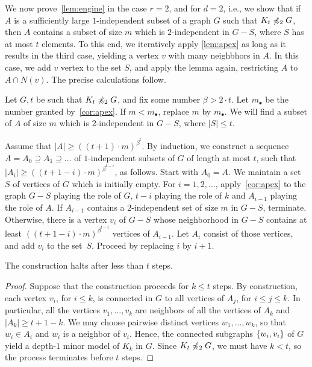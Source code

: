 We now prove~\cref{lem:engine} in the case $r=2$, and for $d=2$, i.e., we show  that if $A$ is a sufficiently large $1$-independent subset of a graph $G$ such that $K_t\not\preccurlyeq_2 G$, then $A$ contains a subset of size $m$
which is  $2$-independent in  $G-S$, where $S$ has at most $t$ elements. 
To this end, we iteratively apply \cref{lem:apex} as long as  it results in the third case, yielding a vertex $v$ with many neighbhors in $A$. In this case, we add $v$ vertex to the set $S$, and apply the lemma again,
restricting $A$ to $A\cap N(v)$. 
The precise calculations follow.

Let $G,t$ be such that $K_t\not\preccurlyeq_2 G$, and fix some number $\beta>2\cdot t$. Let $m_\bullet$ be the number granted by~\cref{cor:apex}. If $m<m_\bullet$, replace $m$ by $m_\bullet$. We will find 
a subset of $A$ of size $m$ which is $2$-independent in $G-S$, where $|S|\le t$.


Assume that $|A|\ge ((t+1)\cdot m)^{\beta^{t}}$. By induction, we
 construct a sequence  $A=A_0\supseteq A_1\supseteq\ldots$ 
of $1$-independent subsets of $G$
of length at most $t$,
such that $|A_i|\ge ((t+1-i)\cdot m)^{\beta^{t-i}}$,
 as follows. Start with $A_0=A$. We maintain a set $S$ of vertices of $G$ which is initially empty.
For $i=1,2,\ldots$,
 apply~\cref{cor:apex} to the graph $G-S$ playing the role of $G$, 
$t-i$ playing the role of $k$ and $A_{i-1}$
 playing the role of $A$.
If $A_{i-1}$ contains a $2$-independent set of size $m$ in $G-S$, terminate.
 Otherwise, there is a vertex $v_i$ of $G-S$
 whose neighborhood in $G-S$ contains at least
 $((t+1-i)\cdot m)^{\beta^{t-i}}$ vertices of $A_{i-1}$.
 Let $A_{i}$ consist of those vertices, and add $v_i$
 to the set~$S$.  
  Proceed by replacing $i$ by $i+1$.

\begin{claim}\label{claim:at-most-t}
	The construction halts after less than $t$ steps.
\end{claim}
\begin{proof}
Suppose that the construction proceeds for $k\le t$ steps.
By construction, each vertex $v_i$, for $i\le k$, is connected in $G$
 to all vertices of $A_{j}$, for $i\le j\le k$. In particular, all the vertices $v_1,\ldots,v_k$ are neighbors of all the vertices of $A_{k}$
 and $|A_k|\ge t+1-k$.
We may choose pairwise distinct vertices $w_1,\ldots,w_k$,
 so that $w_i\in A_i$ and $w_i$ is a neighbor of $v_i$.
 Hence, the connected subgraphs $\{w_i,v_i\}$ of $G$ yield a depth-$1$ minor model of $K_k$ in $G$.
 Since $K_t\not\preccurlyeq_2 G$, we must have $k<t$, so the process terminates before $t$ steps.
 \end{proof}
 
